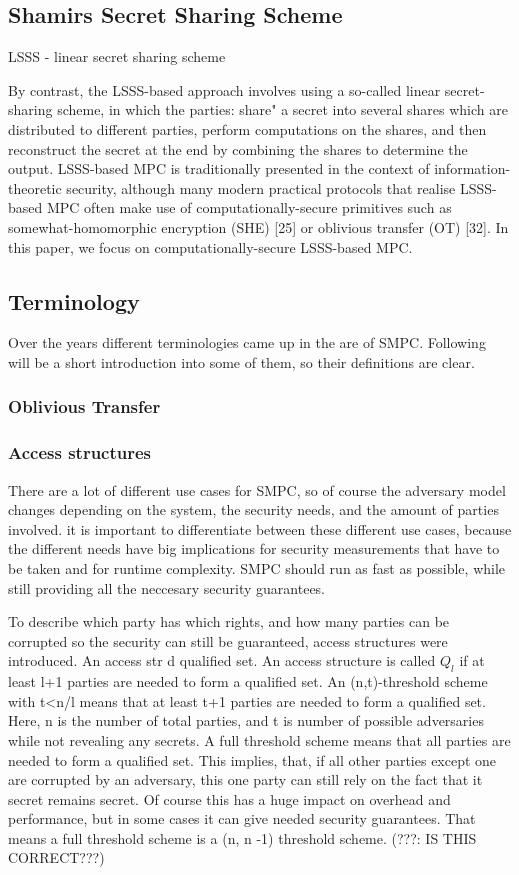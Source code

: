 \documentclass[english,runningheads,a4paper]{llncs}[2018/03/10]
\begin{document}
 
\subsection{Shamirs Secret Sharing Scheme}

LSSS - linear secret sharing scheme

By contrast, the LSSS-based approach involves using a so-called linear
secret-sharing scheme, in which the parties: share" a secret into several shares
which are distributed to different parties, perform computations on the shares,
and then reconstruct the secret at the end by combining the shares to determine
the output. LSSS-based MPC is traditionally presented in the context of
information-theoretic security, although many modern practical protocols that
realise LSSS-based MPC often make use of computationally-secure primitives
such as somewhat-homomorphic encryption (SHE) [25] or oblivious transfer
(OT) [32]. In this paper, we focus on computationally-secure LSSS-based MPC.


\subsection{Terminology}
Over the years different terminologies came up in the are of SMPC. Following will be a short introduction into some of them, so their definitions are clear.

\subsubsection{Oblivious Transfer}

\subsubsection{Access structures}
There are a lot of different use cases for SMPC, so of course the adversary model changes depending on the system, the security needs, and the amount of parties involved. it is important to differentiate between these different use cases, because the different needs have big implications for security measurements that have to be taken and for runtime complexity. SMPC should run as fast as possible, while still providing all the neccesary security guarantees.

To describe which party has which rights, and how many parties can be corrupted so the security can still be guaranteed, access structures were introduced.
An access str 
d qualified set.  An access structure is called \(Q_l \) if at least l+1 parties are needed to  form a qualified set. 
An (n,t)-threshold scheme with t<n/l means that at least t+1 parties are needed to form a qualified set. Here, n is the number of total parties, and t is number of possible adversaries while not revealing any secrets.
A full threshold scheme means that all parties are needed to form a qualified set. This implies, that, if all other parties except one are corrupted by an adversary, this one party can still rely on the fact that it secret remains secret. Of course this has a huge impact on overhead and performance, but in some cases it can give needed security guarantees. That means a full threshold scheme is a (n, n -1) threshold scheme. (???: IS THIS CORRECT???)
\end{document}
